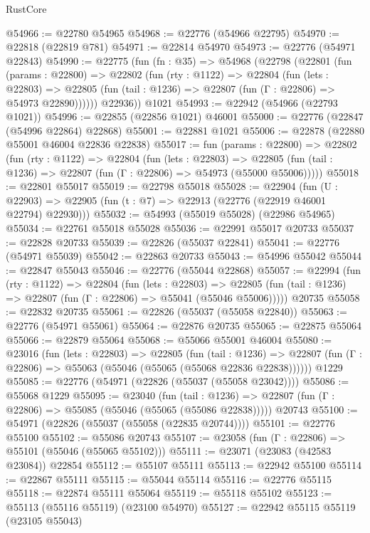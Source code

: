 \begin{lexlean}{RustCore}
\begin{coremodule}
@54966 := @22780 @54965
@54968 := @22776 (@54966 @22795)
@54970 := @22818 (@22819 @781)
@54971 := @22814 @54970
@54973 := @22776 (@54971 @22843)
@54990 := @22775
    (fun (fn : @35) =>
    @54968
      (@22798
        (@22801
          (fun (params : @22800) =>
          @22802
            (fun (rty : @1122) =>
            @22804
              (fun (lets : @22803) =>
              @22805 (fun (tail : @1236) => @22807 (fun (Γ : @22806) => @54973 @22890))))))
        @22936))
    @1021
@54993 := @22942 (@54966 (@22793 @1021))
@54996 := @22855 (@22856 @1021) @46001
@55000 := @22776 (@22847 (@54996 @22864) @22868)
@55001 := @22881 @1021
@55006 := @22878 (@22880 @55001 @46004 @22836 @22838)
@55017 := fun (params : @22800) =>
  @22802
    (fun (rty : @1122) =>
    @22804
      (fun (lets : @22803) =>
      @22805 (fun (tail : @1236) => @22807 (fun (Γ : @22806) => @54973 (@55000 @55006)))))
@55018 := @22801 @55017
@55019 := @22798 @55018
@55028 := @22904
    (fun (U : @22903) => @22905 (fun (t : @7) => @22913 (@22776 (@22919 @46001 @22794) @22930)))
@55032 := @54993 (@55019 @55028) (@22986 @54965)
@55034 := @22761 @55018 @55028
@55036 := @22991 @55017 @20733
@55037 := @22828 @20733
@55039 := @22826 (@55037 @22841)
@55041 := @22776 (@54971 @55039)
@55042 := @22863 @20733
@55043 := @54996 @55042
@55044 := @22847 @55043
@55046 := @22776 (@55044 @22868)
@55057 := @22994
    (fun (rty : @1122) =>
    @22804
      (fun (lets : @22803) =>
      @22805 (fun (tail : @1236) => @22807 (fun (Γ : @22806) => @55041 (@55046 @55006)))))
    @20735
@55058 := @22832 @20735
@55061 := @22826 (@55037 (@55058 @22840))
@55063 := @22776 (@54971 @55061)
@55064 := @22876 @20735
@55065 := @22875 @55064
@55066 := @22879 @55064
@55068 := @55066 @55001 @46004
@55080 := @23016
    (fun (lets : @22803) =>
    @22805
      (fun (tail : @1236) =>
      @22807 (fun (Γ : @22806) => @55063 (@55046 (@55065 (@55068 @22836 @22838))))))
    @1229
@55085 := @22776 (@54971 (@22826 (@55037 (@55058 @23042))))
@55086 := @55068 @1229
@55095 := @23040
    (fun (tail : @1236) => @22807 (fun (Γ : @22806) => @55085 (@55046 (@55065 (@55086 @22838)))))
    @20743
@55100 := @54971 (@22826 (@55037 (@55058 (@22835 @20744))))
@55101 := @22776 @55100
@55102 := @55086 @20743
@55107 := @23058 (fun (Γ : @22806) => @55101 (@55046 (@55065 @55102)))
@55111 := @23071 (@23083 (@42583 @23084)) @22854
@55112 := @55107 @55111
@55113 := @22942 @55100
@55114 := @22867 @55111
@55115 := @55044 @55114
@55116 := @22776 @55115
@55118 := @22874 @55111 @55064
@55119 := @55118 @55102
@55123 := @55113 (@55116 @55119) (@23100 @54970)
@55127 := @22942 @55115 @55119 (@23105 @55043)

\end{coremodule}
\end{lexlean}
